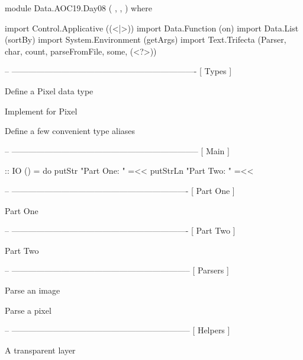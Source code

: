 module Data.AOC19.Day08
  ( 
  , , 
  ) where


import           Control.Applicative ((<|>))
import           Data.Function       (on)
import           Data.List           (sortBy)
import           System.Environment  (getArgs)
import           Text.Trifecta       (Parser, char, count, parseFromFile, some,
                                      (<?>))


-- ------------------------------------------------------------------- [ Types ]

\LA{}Define a Pixel data type~{\nwtagstyle{}}\RA{}


\LA{}Implement  for \code{}Pixel\edoc{}~{\nwtagstyle{}}\RA{}


\LA{}Define a few convenient type aliases~{\nwtagstyle{}}\RA{}


-- -------------------------------------------------------------------- [ Main ]

 :: IO ()
 =
    do putStr "Part One: "
        =<< 
       putStrLn "Part Two: "
        =<< 


-- ---------------------------------------------------------------- [ Part One ]

\LA{}Part One~{\nwtagstyle{}}\RA{}


-- ---------------------------------------------------------------- [ Part Two ]

\LA{}Part Two~{\nwtagstyle{}}\RA{}


-- ----------------------------------------------------------------- [ Parsers ]

\LA{}Parse an image~{\nwtagstyle{}}\RA{}


\LA{}Parse a pixel~{\nwtagstyle{}}\RA{}


-- ----------------------------------------------------------------- [ Helpers ]

\LA{}A transparent layer~{\nwtagstyle{}}\RA{}


